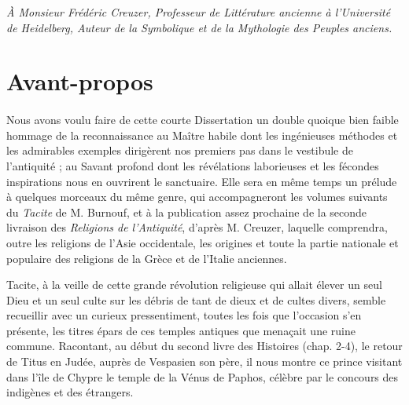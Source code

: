 \documentclass[a4paper, 11pt, oneside, polutonikogreek, french]{article}
\begin{document}
\setlength{\parskip}{1mm plus1mm minus1mm}
\clearpage
\vspace*{\fill}
\begin{center}
\emph{À Monsieur Frédéric Creuzer, Professeur de Littérature ancienne à l'Université de Heidelberg, Auteur de la Symbolique et de la Mythologie des Peuples anciens.}
\end{center}
\vspace*{\fill}
\clearpage
\section*{Avant-propos}
\paragraph{}
Nous avons voulu faire de cette courte Dissertation un double quoique bien faible hommage de la reconnaissance au Maître habile dont les ingénieuses méthodes et les admirables exemples dirigèrent nos premiers pas dans le vestibule de l'antiquité ; au Savant profond dont les révélations laborieuses et les fécondes inspirations nous en ouvrirent le sanctuaire. Elle sera en même temps un prélude à quelques morceaux du même genre, qui accompagneront les volumes suivants du \emph{Tacite} de M. Burnouf, et à la publication assez prochaine de la seconde livraison des \emph{Religions de l'Antiquité}, d'après M. Creuzer, laquelle comprendra, outre les religions de l'Asie occidentale, les origines et toute la partie nationale et populaire des religions de la Grèce et de l'Italie anciennes.

Tacite, à la veille de cette grande révolution religieuse qui allait élever un seul Dieu et un seul culte sur les débris de tant de dieux et de cultes divers, semble recueillir avec un curieux pressentiment, toutes les fois que l'occasion s'en présente, les titres épars de ces temples antiques que menaçait une ruine commune. Racontant, au début du second livre des Histoires (chap. 2-4), le retour de Titus en Judée, auprès de Vespasien son père, il nous montre ce prince visitant dans l'île de Chypre le temple de la Vénus de Paphos, célèbre par le concours des indigènes et des étrangers.
\end{document}
